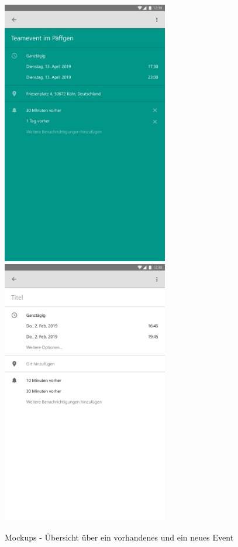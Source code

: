 \begin{figure}[H]
\centering
\begin{minipage}[t]{1\textwidth} %
\caption{Mockups - Übersicht über ein vorhandenes und ein neues Event} %
\includegraphics[width=7.25cm]{img/EventActivity} %
\includegraphics[width=7.25cm]{img/EventActivityNew}\\ %
\end{minipage}
\end{figure}

